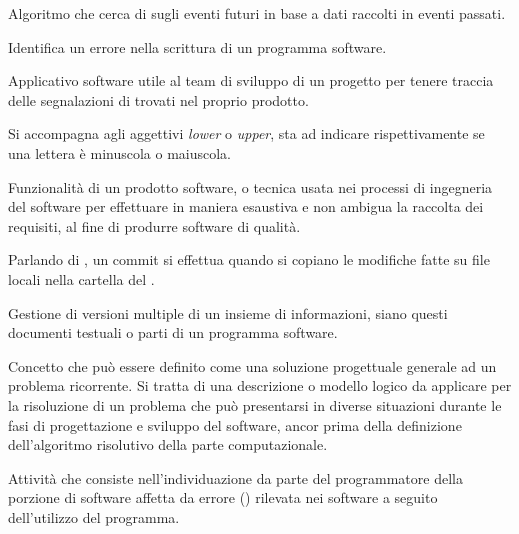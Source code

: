 





\makeFrontPage



\clearpage
\tableofcontents

Algoritmo che cerca di  sugli eventi futuri in base a dati raccolti in eventi passati.

\clearpage

Identifica un errore nella scrittura di un programma software.

Applicativo software utile al team di sviluppo di un progetto per tenere traccia delle segnalazioni di  trovati nel proprio prodotto. 

\clearpage

Si accompagna agli aggettivi \textit{lower} o \textit{upper}, sta ad indicare rispettivamente se una lettera è minuscola o maiuscola.

Funzionalità di un prodotto software, o tecnica usata nei processi di ingegneria del software per effettuare in maniera esaustiva e non ambigua la raccolta dei requisiti, al fine di produrre software di qualità.

Parlando di , un commit si effettua quando si copiano le modifiche fatte su file locali nella cartella del .

Gestione di versioni multiple di un insieme di informazioni, siano questi documenti testuali o parti di un programma software.

\clearpage

Concetto che può essere definito come una soluzione progettuale generale ad un problema ricorrente. Si tratta di una descrizione o modello logico da applicare per la risoluzione di un problema che può presentarsi in diverse situazioni durante le fasi di progettazione e sviluppo del software, ancor prima della definizione dell'algoritmo risolutivo della parte computazionale.

Attività che consiste nell'individuazione da parte del programmatore della porzione di software affetta da errore () rilevata nei software a seguito dell'utilizzo del programma.
\clearpage

